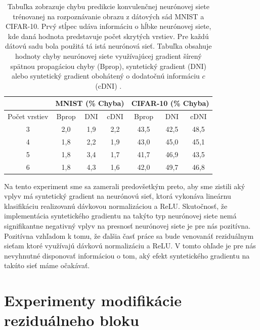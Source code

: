\begin{table}
\caption[Porovnanie chyby neurónovej siete trénovanej rôznymi typmi gradientu]{Tabuľka zobrazuje chybu predikcie konvulenčnej neurónovej siete trénovanej na rozpoznávanie obrazu z dátových sád MNIST a CIFAR-10. Prvý stĺpec udáva informáciu o hĺbke neurónovej siete, kde daná hodnota predstavuje počet skrytých vrstiev. Pre každú dátovú sadu bola použitá tá istá neurónová sieť. Tabuľka obsahuje hodnoty chyby neurónovej siete využívajúcej gradient šírený spätnou propagáciou chyby (Bprop), syntetický gradient (DNI) alebo syntetický gradient obohátený o dodatočnú informáciu $c$ (cDNI) \cite{Jaderberg2016}.}
\label{compareDNIandCDNI}
\begin{center}
\begin{tabular}{cc|ccc|ccc}
\toprule
      &       & \multicolumn{3}{c|}{MNIST (\% Chyba)} & \multicolumn{3}{c}{CIFAR-10 (\% Chyba)} \\
\midrule
\multicolumn{2}{c|}{Počet vrstiev} & Bprop & DNI  & cDNI  & Bprop & DNI & cDNI \\ \hline
\hline
\multicolumn{2}{c|}{3} & 2,0 & 1,9 & 2,2 & 43,5 & 42,5 & 48,5 \\
\multicolumn{2}{c|}{4} & 1,8 & 2,2 & 1,9 & 43,0 & 45,0 & 45,1 \\
\multicolumn{2}{c|}{5} & 1,8 & 3,4 & 1,7 & 41,7 & 46,9 & 43,5 \\
\multicolumn{2}{c|}{6} & 1,8 & 4,3 & 1,6 & 42,0 & 49,7 & 46,8 \\
\hline
\bottomrule
\end{tabular}%
\end{center}
\end{table}

Na tento experiment sme sa zamerali predovšetkým preto, aby sme zistili aký vplyv má syntetický gradient na neurónovú sieť, ktorá vykonáva lineárnu klasifikáciu realizovanú dávkovou normalizáciou a ReLU. Skutočnosť, že implementácia syntetického gradientu na takýto typ neurónovej siete nemá signifikantne negativný vplyv na presnosť neurónovej siete je pre nás pozitívna. Pozitívna vzhľadom k tomu, že ďalšia časť práce sa bude venovanáť reziduálnym sieťam ktoré využívajú dávkovú normalizáciu a ReLU. V tomto ohľade je pre nás nevyhnutné disponovať informáciou o tom, aký efekt syntetického gradientu na takúto sieť máme očakávať.

\chapter{Experimenty modifikácie reziduálneho bloku}

